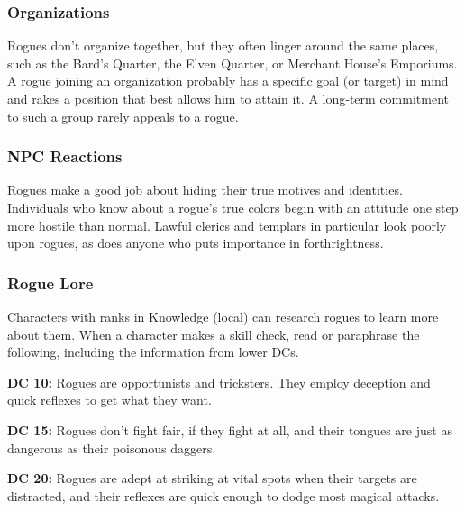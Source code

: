 \subsubsection{Organizations}
Rogues don't organize together, but they often linger around the same places, such as the Bard's Quarter, the Elven Quarter, or Merchant House's Emporiums. A rogue joining an organization probably has a specific goal (or target) in mind and rakes a position that best allows him to attain it. A long‐term commitment to such a group rarely appeals to a rogue.

\subsubsection{NPC Reactions}
Rogues make a good job about hiding their true motives and identities. Individuals who know about a rogue's true colors begin with an attitude one step more hostile than normal. Lawful clerics and templars in particular look poorly upon rogues, as does anyone who puts importance in forthrightness.

\subsubsection{Rogue Lore}
Characters with ranks in Knowledge (local) can research rogues to learn more about them. When a character makes a skill check, read or paraphrase the following, including the information from lower DCs.

\textbf{DC 10:} Rogues are opportunists and tricksters. They employ deception and quick reflexes to get what they want.

\textbf{DC 15:} Rogues don't fight fair, if they fight at all, and their tongues are just as dangerous as their poisonous daggers.

\textbf{DC 20:} Rogues are adept at striking at vital spots when their targets are distracted, and their reflexes are quick enough to dodge most magical attacks.